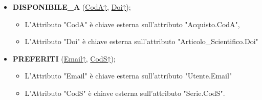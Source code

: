 \begin{itemize}
       \item {\bf DISPONIBILE\_A} (\underline{CodA↑}, \underline{Doi↑});
        \begin{itemize}
            \textit{Relazione derivata dalla associazione "DISPONIBILE\_A" di molteplicità N a N, tra "Articolo\_Scientifico" e "Acquisto".}
            \item L'Attributo "CodA" è chiave esterna sull'attributo "Acquisto.CodA",
            \item L'Attributo "Doi" è chiave esterna sull'attributo "Articolo\_Scientifico.Doi"
        \end{itemize}
        
        \item {\bf PREFERITI} (\underline{Email↑}, \underline{CodS↑});
            \begin{itemize}
              \textit{Relazione derivata dalla associazione "PREFERITI" di molteplicità N a N, tra "Utente" e "Serie".}   
                \item L'Attributo "Email" è chiave esterna sull'attributo "Utente.Email"
                \item L'Attributo "CodS" è chiave esterna sull'attributo "Serie.CodS".
            \end{itemize}
        
    \end{itemize}

    
    